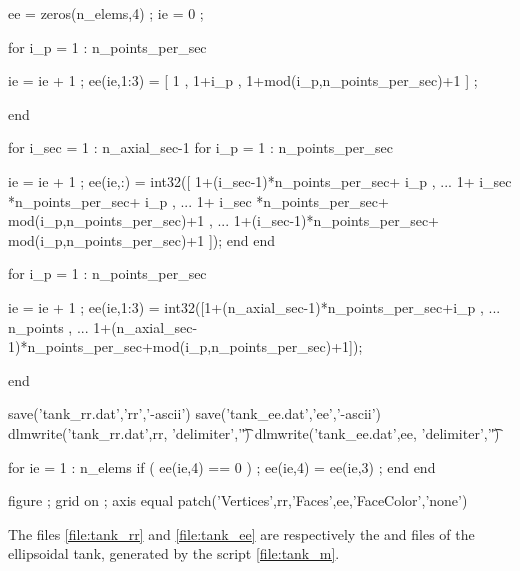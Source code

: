 \begin{inputfile}[frame=single, caption={\opt{tank.m}}, label={file:tank_m}]
ee = zeros(n_elems,4) ; ie = 0 ; %

for i_p = 1 : n_points_per_sec

  ie = ie + 1 ;
  ee(ie,1:3) = [ 1 , 1+i_p , 1+mod(i_p,n_points_per_sec)+1 ] ;

end

for i_sec = 1 : n_axial_sec-1
  for i_p = 1 : n_points_per_sec

    ie = ie + 1 ;
    ee(ie,:) = int32([ 1+(i_sec-1)*n_points_per_sec+ i_p , ...
                 1+ i_sec   *n_points_per_sec+ i_p , ...
                 1+ i_sec   *n_points_per_sec+ mod(i_p,n_points_per_sec)+1 , ...
                 1+(i_sec-1)*n_points_per_sec+ mod(i_p,n_points_per_sec)+1 ]);
  end
end

for i_p = 1 : n_points_per_sec

  ie = ie + 1 ;
  ee(ie,1:3) = int32([1+(n_axial_sec-1)*n_points_per_sec+i_p , ...
                n_points , ...
                1+(n_axial_sec-1)*n_points_per_sec+mod(i_p,n_points_per_sec)+1]);
                 
end

save('tank_rr.dat','rr','-ascii')
save('tank_ee.dat','ee','-ascii')
dlmwrite('tank_rr.dat',rr, 'delimiter','\t')
dlmwrite('tank_ee.dat',ee, 'delimiter','\t')


for ie = 1 : n_elems
 if ( ee(ie,4) == 0 ) ; ee(ie,4) = ee(ie,3) ; end 
end

figure ; grid on ; axis equal
patch('Vertices',rr,'Faces',ee,'FaceColor','none')

\end{inputfile}

\noindent
The files \ref{file:tank_rr} and \ref{file:tank_ee} are respectively the  and  files of the ellipsoidal tank, generated by the  script \ref{file:tank_m}.

